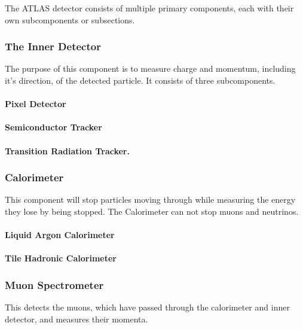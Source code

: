 \documentclass[11pt,a4paper]{article}
\begin{document}

The ATLAS detector consists of multiple primary components, each with their own
subcomponents or subsections.

\subsubsection{The Inner Detector}
The purpose of this component is to measure charge and momentum, including it's
direction, of the detected particle. It consists of three subcomponents.
\paragraph{Pixel Detector}
\paragraph{Semiconductor Tracker}
\paragraph{Transition Radiation Tracker.}

\subsubsection{Calorimeter}
This component will stop particles moving through while measuring the
energy they lose by being stopped. %
The Calorimeter can not stop muons and neutrinos.

\paragraph{Liquid Argon Calorimeter}
\paragraph{Tile Hadronic Calorimeter}

\subsubsection{Muon Spectrometer}
This detects the muons, which have passed through the calorimeter and inner
detector, and measures their momenta.
\end{document}
